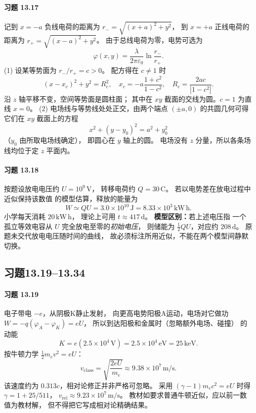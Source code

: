 \paragraph{习题 13.17}
记到 \(x=-a\) 负线电荷的距离为
\(r_-=\sqrt{(x+a)^2+y^2}\)，
到 \(x=+a\) 正线电荷的距离为
\(r_+=\sqrt{(x-a)^2+y^2}\)。
由于总线电荷为零，电势可选为
\[
 \varphi(x,y)=\frac{\lambda}{2\pi\varepsilon_0}
 \ln\frac{r_-}{r_+}.
\]
(1) 设某等势面为 \(r_-/r_+=c>0\)。
配方得在 \(c\ne1\) 时
\[
 \boxed{(x-x_c)^2+y^2=R_c^2,\quad
 x_c=-a\frac{1+c^2}{1-c^2},\quad
 R_c=\frac{2ac}{|1-c^2|}}.
\]
沿 \(z\) 轴平移不变，空间等势面是圆柱面；
其中在 \(xy\) 截面的交线为圆。\(c=1\) 为直线 \(x=0\)。
(2) 电场线与等势线处处正交，由两个端点
\((\pm a,0)\) 的共圆几何可得它们在
\(xy\) 截面上的方程
\[
 \boxed{x^2+(y-y_0)^2=a^2+y_0^2}
\]
（\(y_0\) 由所取电场线确定），
即圆心在 \(y\) 轴上的圆。
电场没有 \(z\) 分量，所以各条场线均位于定 \(z\) 平面内。

\paragraph{习题 13.18}
按题设放电电压约 \(U=10^9\,\mathrm V\)，
转移电荷约 \(Q=30\,\mathrm C\)。
若以电势差在放电过程中近似保持该数值
的模型估算，释放的能量为
\[
 \boxed{W\simeq QU=3.0\times10^{10}\,\mathrm J
 =8.33\times10^3\,\mathrm{kW\,h}}.
\]
小学每天消耗 \(20\,\mathrm{kW\,h}\)，
理论上可用
\(\boxed{t\approx417\,\mathrm d}\)。
\textbf{模型区别：}若上述电压指
一个孤立等效电容从 \(U\) 完全放电至零的\emph{初始电压}，
则储能为 \(\frac12 QU\)，对应约 \(208\,\mathrm d\)。
原题未交代放电电压随时间的曲线，
故必须标注所用近似，不能在两个模型间静默切换。


\subsection*{习题13.19--13.34}
\paragraph{习题 13.19}
电子带电 \(-e\)，从阴极K静止发射，
向更高电势阳极A运动，电场对它做功
\(W=-q(\varphi_A-\varphi_K)=eU\)，
所以到达阳极和金属时（忽略额外电场、碰撞）
的动能
\[
 \boxed{K=e(2.5\times10^4\,\mathrm V)
 =2.5\times10^4\,\mathrm{eV}=25\,\mathrm{keV}}.
\]
按牛顿力学 \(\frac12m_ev^2=eU\)：
\[
 \boxed{v_{\mathrm{class}}=\sqrt{\frac{2eU}{m_e}}
 \approx9.38\times10^7\,\mathrm{m/s}}.
\]
该速度约为 \(0.313c\)，相对论修正并非严格可忽略。
采用 \((\gamma-1)m_ec^2=eU\) 时得
\(\gamma=1+25/511\)，
\(v_{\mathrm{rel}}\approx9.23\times10^7\,\mathrm{m/s}\)。
教材如要求普通牛顿近似，应以前一数值为教材解，
但不得把它写成相对论精确结果。

